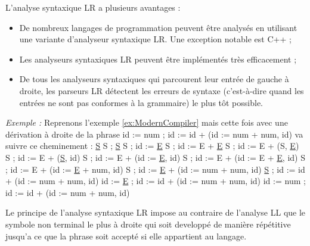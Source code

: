 \documentclass{article}
\begin{document}
L'analyse syntaxique LR a plusieurs avantages :
\begin{itemize}
    \item De nombreux langages de programmation peuvent être analysés en utilisant une variante d'analyseur syntaxique LR. Une exception notable est C++ ;
    \item Les analyseurs syntaxiques LR peuvent être implémentés très efficacement ;
    \item De tous les analyseurs syntaxiques qui parcourent leur entrée de gauche à droite, les parseurs LR détectent les erreurs de syntaxe (c'est-à-dire quand les entrées ne sont pas conformes à la grammaire) le plus tôt possible.
\end{itemize}
\textit{Exemple :}
\newline\newline
Reprenons l'exemple \ref{ex:ModernCompiler} mais cette fois avec une dérivation à droite de la phrase \newline 
id := num ; id := id + (id := num + num, id) va suivre ce cheminement :\newline\newline
\underline{S}\newline
S ; \underline{S}\newline
S ; id := \underline{E}\newline
S ; id := E + \underline{E}\newline
S ; id := E + (S, \underline{E})\newline
S ; id := E + (\underline{S}, id)\newline
S ; id := E + (id := \underline{E}, id)\newline
S ; id := E + (id := E + \underline{E}, id)\newline
S ; id := E + (id := \underline{E} + num, id)\newline
S ; id := \underline{E} + (id := num + num, id)\newline
\underline{S} ; id := id + (id := num + num, id)\newline
id := \underline{E} ; id := id + (id := num + num, id)\newline
id := num ; id := id + (id := num + num, id)\newline

Le principe de l'analyse syntaxique LR impose au contraire de l'analyse LL que le symbole non terminal le plus à droite qui soit developpé de manière répétitive jusqu'a ce que la phrase soit accepté si elle appartient au langage.
\end{document}
